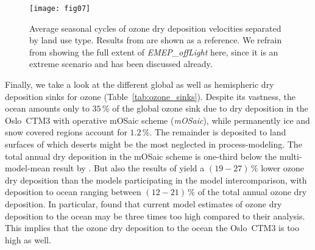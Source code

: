 \documentclass[gmd, manuscript]{copernicus}
\begin{document}
%
\begin{figure}[t]
  \texttt{[image: fig07]}
  \caption{Average seasonal cycles of ozone dry deposition velocities separated by land use type. Results from \citep{ACP:Hardacre2015} are shown as a reference. We refrain from showing the full extent of \emph{EMEP\_offLight} here, since it is an extreme scenario and has been discussed already.}
  \label{fig:mmm_drydep_season_pft}
\end{figure}
%

Finally, we take a look at the different global as well as hemispheric dry deposition sinks for ozone (Table~\ref{tab:ozone_sinks}). Despite its vastness, the ocean amounts only to $35\,\unit{\%}$ of the global ozone sink due to dry deposition in the Oslo~CTM3 with operative mOSaic scheme (\emph{mOSaic}), while permanently ice and snow covered regions account for $1.2\,\unit{\%}$. The remainder is deposited to land surfaces of which deserts might be the most neglected in process-modeling. The total annual dry deposition in the mOSaic scheme is one-third below the multi-model-mean result by \citet{ACP:Hardacre2015}. But also the results of \citet{ACP:Luhar2017, ACP:Luhar2018} yield a $(19-27)\,\unit{\%}$ lower ozone dry deposition than the models participating in the model intercomparison, with deposition to ocean ranging between $(12-21)\,\unit{\%}$ of the total annual ozone dry deposition. In particular, \citet{ACP:Luhar2018} found that current model estimates of ozone dry deposition to the ocean may be three times too high compared to their analysis. This implies that the ozone dry deposition to the ocean the Oslo~CTM3 is too high as well.
%
\end{document}
